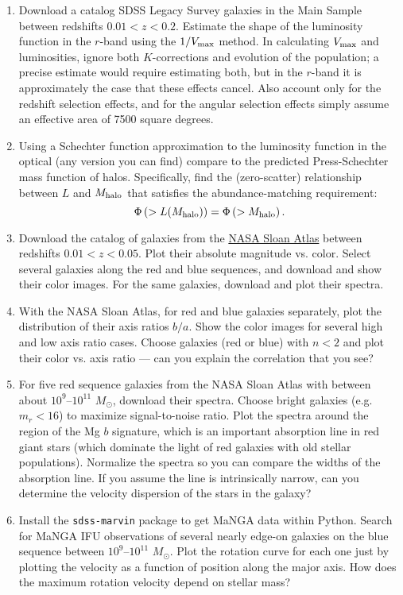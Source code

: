 \begin{enumerate}
\item Download a catalog SDSS Legacy Survey galaxies in the Main
Sample between redshifts $0.01 < z < 0.2$. Estimate the shape of the
luminosity function in the $r$-band using the $1/V_{\rm max}$
method. In calculating $V_{\rm max}$ and luminosities, ignore both
$K$-corrections and evolution of the population; a precise estimate
would require estimating both, but in the $r$-band it is approximately
the case that these effects cancel. Also account only for the redshift
selection effects, and for the angular selection effects simply assume
an effective area of 7500 square degrees.
\item Using a Schechter function approximation to the luminosity
function in the optical (any version you can find) compare to the
predicted Press-Schechter mass function of halos. Specifically, find
the (zero-scatter) relationship between $L$ and $M_{\rm halo}$ that
satisfies the abundance-matching requirement:
\begin{equation}
\Phi\left(>L(M_{\rm halo})\right) = \Phi\left(>M_{\rm halo}\right).
\end{equation}
\item Download the catalog of galaxies from
the \href{http://nsatlas.org}{NASA Sloan Atlas} between redshifts
$0.01 < z <0.05$. Plot their absolute magnitude vs. color. Select
several galaxies along the red and blue sequences, and download and
show their color images. For the same galaxies, download and plot
their spectra.
\item With the NASA Sloan Atlas, for red and blue galaxies separately, plot the
distribution of their axis ratios $b/a$. Show the color images for
several high and low axis ratio cases. Choose galaxies (red or blue)
with $n<2$ and plot their color vs. axis ratio --- can you explain the
correlation that you see?
\item For five red sequence galaxies from the NASA Sloan Atlas with
between about $10^9$--$10^{11}$ $M_\odot$, download their
spectra. Choose bright galaxies (e.g. $m_r < 16$) to maximize
signal-to-noise ratio. Plot the spectra around the region of the Mg
$b$ signature, which is an important absorption line in red giant
stars (which dominate the light of red galaxies with old stellar
populations). Normalize the spectra so you can compare the widths of
the absorption line. If you assume the line is intrinsically narrow,
can you determine the velocity dispersion of the stars in the galaxy?
\item Install the {\tt sdss-marvin} package to get MaNGA data within
Python. Search for MaNGA IFU observations of several nearly edge-on
galaxies on the blue sequence between $10^9$--$10^{11}$
$M_\odot$. Plot the rotation curve for each one just by plotting the
velocity as a function of position along the major axis. How does the
maximum rotation velocity depend on stellar mass?
\end{enumerate}


  
